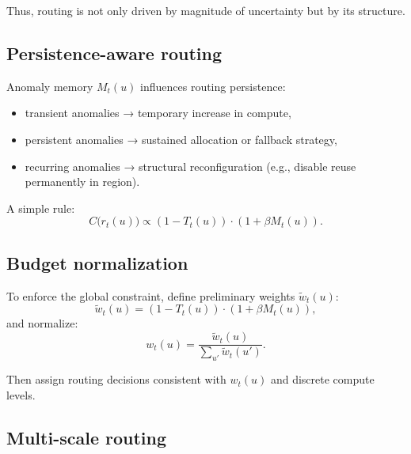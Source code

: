 \documentclass[11pt,letterpaper]{article}
\theoremstyle{gcresult}
\theoremstyle{definition}
\begin{document}
Thus, routing is not only driven by magnitude of uncertainty but by its structure.


\subsection{Persistence-aware routing}

Anomaly memory $M_t(u)$ influences routing persistence:
\begin{itemize}[leftmargin=1.5em]
    \item transient anomalies → temporary increase in compute,
    \item persistent anomalies → sustained allocation or fallback strategy,
    \item recurring anomalies → structural reconfiguration (e.g., disable reuse permanently in region).
\end{itemize}

A simple rule:
\begin{equation}
C\bigl(r_t(u)\bigr) \propto (1 - T_t(u)) \cdot (1 + \beta M_t(u)).
\end{equation}


\subsection{Budget normalization}

To enforce the global constraint, define preliminary weights $\tilde{w}_t(u)$:
\begin{equation}
\tilde{w}_t(u)=(1 - T_t(u))\cdot(1 + \beta M_t(u)),
\end{equation}
and normalize:
\begin{equation}
w_t(u)=\frac{\tilde{w}_t(u)}{\sum_{u'} \tilde{w}_t(u')}.
\end{equation}

Then assign routing decisions consistent with $w_t(u)$ and discrete compute levels.


\subsection{Multi-scale routing}
\end{document}
